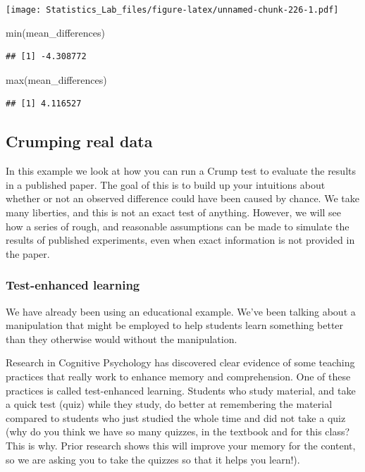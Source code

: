 \documentclass[
]{book}
\newenvironment{Shaded}{\begin{snugshade}}{\end{snugshade}}
\newcommand{\FunctionTok}[1]{\textcolor[rgb]{0.00,0.00,0.00}{#1}}
\newcommand{\NormalTok}[1]{#1}
\begin{document}
\texttt{[image: Statistics\_Lab\_files/figure-latex/unnamed-chunk-226-1.pdf]}

\begin{Shaded}
\begin{Highlighting}[]
\FunctionTok{min}\NormalTok{(mean\_differences)}
\end{Highlighting}
\end{Shaded}

\begin{verbatim}
## [1] -4.308772
\end{verbatim}

\begin{Shaded}
\begin{Highlighting}[]
\FunctionTok{max}\NormalTok{(mean\_differences)}
\end{Highlighting}
\end{Shaded}

\begin{verbatim}
## [1] 4.116527
\end{verbatim}

\hypertarget{crumping-real-data}{%
\subsection{Crumping real data}\label{crumping-real-data}}

In this example we look at how you can run a Crump test to evaluate the results in a published paper. The goal of this is to build up your intuitions about whether or not an observed difference could have been caused by chance. We take many liberties, and this is not an exact test of anything. However, we will see how a series of rough, and reasonable assumptions can be made to simulate the results of published experiments, even when exact information is not provided in the paper.

\hypertarget{test-enhanced-learning}{%
\subsubsection{Test-enhanced learning}\label{test-enhanced-learning}}

We have already been using an educational example. We've been talking about a manipulation that might be employed to help students learn something better than they otherwise would without the manipulation.

Research in Cognitive Psychology has discovered clear evidence of some teaching practices that really work to enhance memory and comprehension. One of these practices is called test-enhanced learning. Students who study material, and take a quick test (quiz) while they study, do better at remembering the material compared to students who just studied the whole time and did not take a quiz (why do you think we have so many quizzes, in the textbook and for this class? This is why. Prior research shows this will improve your memory for the content, so we are asking you to take the quizzes so that it helps you learn!).
\end{document}

